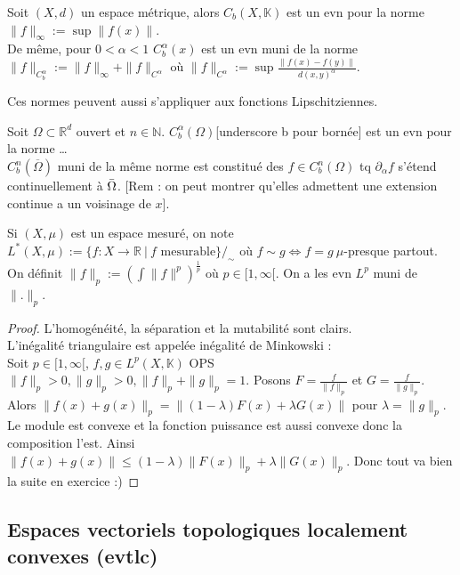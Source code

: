 \begin{ex}
    Soit $(X,d)$ un espace métrique, alors $C_b(X,\mathbb{K})$ est un evn pour la norme $\|f\|_\infty :=\sup\|f(x)\|$.\\
    De même, pour $ 0<\alpha <1$ $C^\alpha_b(x)$ est un evn muni de la norme \\
    $\|f\|_{C^\alpha_b }:=\|f\|_\infty +\|f\|_{C^\alpha }$ où $\|f\|_{C^\alpha }:=\sup \frac{\|f(x)-f(y)\|}{d(x,y)^\alpha }$.
\end{ex}
Ces normes peuvent aussi s'appliquer aux fonctions Lipschitziennes.

\begin{ex}
    Soit $\Omega\subset \mathbb{R} ^d$ ouvert et $n\in \mathbb{N} $. $C^\alpha _b(\Omega)$[underscore b pour bornée] est un evn pour la norme \ldots\\
    $C^n_b(\overline{\Omega})$ muni de la même norme est constitué des $f\in C^n_b(\Omega)$ tq $\partial_\alpha f$ s'étend continuellement à $\Bar{\Omega}$. [Rem : on peut montrer qu'elles admettent une extension continue a un voisinage de $x$].
\end{ex}

Si $(X,\mu)$ est un espace mesuré, on note $L^*(X,\mu):=\{f:X\to \mathbb{R} \ |\ f \text{ mesurable}\} /_\sim$ où $f\sim g\Leftrightarrow f=g\ \mu$-presque partout.\\

On définit $\|f\|_p:=\left( \int\|f\|^p \right)^{\frac{1}{p}}$ où $p\in [1,\infty [$. On a les evn $L^p$ muni de $\|.\|_p$.\\
\begin{proof}
    L'homogénéité, la séparation et la mutabilité sont clairs. \\
    L'inégalité triangulaire est appelée inégalité de Minkowski :\\
    Soit $p\in [1,\infty [$, $f,g\in L^p(X,\mathbb{K})$ OPS $\|f\|_p>0,\|g\|_p>0, \|f\|_p+\|g\|_p=1$. Posons $F=\frac{f}{\|f\|_p}$ et $G=\frac{f}{\|g\|_p}$. \\
    Alors $\|f(x)+g(x)\|_p=\|(1-\lambda)F(x)+\lambda G(x)\|$ pour $\lambda=\|g\|_p$. Le module est convexe et la fonction puissance est aussi convexe donc la composition l'est. Ainsi $\|f(x)+g(x)\|\le (1-\lambda)\|F(x)\|_p+\lambda\|G(x)\|_p$. Donc tout va bien la suite en exercice :)
\end{proof}


\subsection{Espaces vectoriels topologiques localement convexes (evtlc)}


